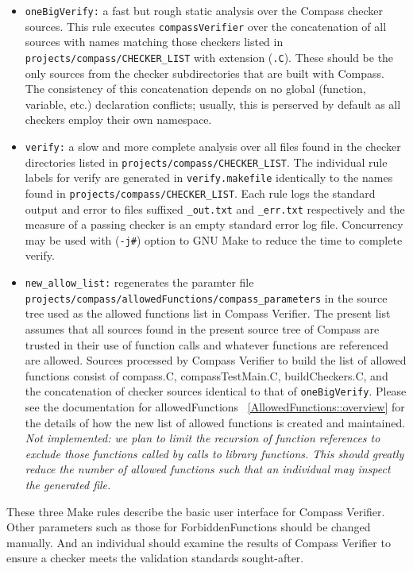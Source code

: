 \begin{itemize}
\item {\tt oneBigVerify:} a fast but rough static analysis over the Compass
	checker sources. This rule executes {\tt compassVerifier} over the
	concatenation of all sources with names matching those checkers listed
	in {\tt projects/compass/CHECKER\_LIST} with extension ({\tt .C}).
	These should be the only sources from the checker subdirectories that
	are built with Compass. The consistency of this concatenation depends
	on no global (function, variable, etc.) declaration conflicts; usually,
	this is perserved by default as all checkers employ their own namespace.
%
\item {\tt verify:} a slow and more complete analysis over all files found in
	the checker directories listed in {\tt projects/compass/CHECKER\_LIST}.
	The individual rule labels for verify are generated in 
	{\tt verify.makefile} identically to the names found in
	{\tt projects/compass/CHECKER\_LIST}. Each rule logs the standard 
	output and error to files suffixed {\tt \_out.txt} and {\tt \_err.txt}
	respectively and the measure of a passing checker is an empty 
	standard error log file. Concurrency may be used with
	({\tt -j\#}) option to GNU Make to reduce the time to complete verify.
%
\item {\tt new\_allow\_list:} regenerates the paramter file 
	{\tt projects/compass/allowedFunctions/compass\_parameters} in the
	source tree used as the allowed functions list in Compass Verifier.
	The present list assumes that all sources found in the present source
	tree of Compass are trusted in their use of function calls and whatever
	functions are referenced are allowed. Sources processed by Compass
	Verifier to build the list of allowed functions consist of
	compass.C, compassTestMain.C, buildCheckers.C, and the concatenation
	of checker sources identical to that of {\tt oneBigVerify}. Please
	see the documentation for allowedFunctions
	~\ref{AllowedFunctions::overview} for the details of how
	the new list of allowed functions is created and maintained.
	{\em Not implemented: we plan to limit the recursion of function
	references to exclude those functions called by calls to library
	functions. This should greatly reduce the number of allowed functions
	such that an individual may inspect the generated file.}
\end{itemize}

These three Make rules describe the basic user interface for Compass Verifier.
Other parameters such as those for ForbiddenFunctions should be changed
manually. And an individual should examine the results of Compass Verifier
to ensure a checker meets the validation standards sought-after.
